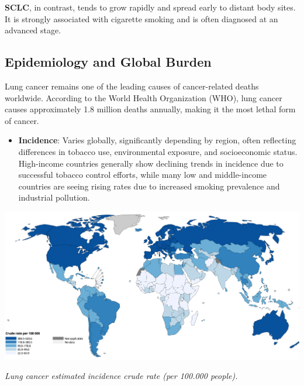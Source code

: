 \textbf{SCLC}, in contrast, tends to grow rapidly and spread early to distant body sites. It is 
strongly associated with cigarette smoking and is often diagnosed at an advanced stage.

\subsection{Epidemiology and Global Burden}
Lung cancer remains one of the leading causes of cancer-related deaths worldwide. According to the 
World Health Organization (WHO), lung cancer causes approximately 1.8 million deaths annually, 
making it the most lethal form of cancer. \cite{who2024}

\begin{itemize}
    \item \textbf{Incidence}: Varies globally, significantly depending by region, often reflecting 
    differences in tobacco use, environmental exposure, and socioeconomic status. High-income 
    countries generally show declining trends in incidence due to successful tobacco control 
    efforts, while many low and middle-income countries are seeing rising rates due to increased 
    smoking prevalence and industrial pollution.
\end{itemize}

\vspace{1em}
\begin{center}
    \includegraphics[width=1.00\textwidth]{assets/01-overview/lc-crude-rate.png}

    \small\textit{Lung cancer estimated incidence crude rate (per 100.000 people). \cite{who2024}}
\end{center}
\vspace{1em}

